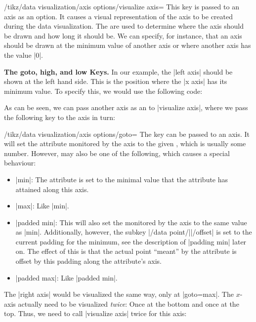 \begin{key}{/tikz/data visualization/axis options/visualize axis=}
  This key is passed to an axis as an option. It causes a visual
  representation of the axis to be created during the data visualization. The
   are used to determine where the axis should be drawn
  and how long it should be. We can specify, for instance, that an
  axis should be drawn at the minimum value of another axis or where
  another axis has the value |0|.
  
  \medskip
  \textbf{The goto, high, and low Keys.}
  In our example, the |left axis| should be shown at the left hand
  side. This is the position where the |x axis| has its minimum
  value. To specify this, we would use the following code:
\begin{codeexample}[code only]
left axis={ visualize axis={ x axis={ goto=min } }
\end{codeexample}
  As can be seen, we can pass another axis as an  to
  |visualize axis|, where we pass the following key to the axis in
  turn: 
  \begin{key}{/tikz/data visualization/axis options/goto=}
    The key can be passed to an axis. It will set the attribute
    monitored by the axis to the given , which is usually
    some number. However,  may also be one of the
    following, which causes a special behaviour:
    \begin{itemize}
    \item
      |min|: The attribute is set to the minimal value that the
      attribute has attained along this axis.
    \item
      |max|: Like |min|.
    \item
      |padded min|: This will also set the  monitored
      by the axis to the same value  as |min|. Additionally, however,
      the subkey |/data point/||/offset| is set to the
      current padding for the minimum, see the description of
      |padding min| later on. The effect of this is that the actual
      point ``meant'' by the attribute is offset by this padding along
      the attribute's axis.
    \item
      |padded max|: Like |padded min|.
    \end{itemize}
  \end{key}

  The |right axis| would be visualized the same way, only at
  |goto=max|. The $x$-axis actually need to be visualized
  \emph{twice}: Once at the bottom and once at the top. Thus, we need
  to call |visualize axis| twice for this axis:
  

\end{key}
